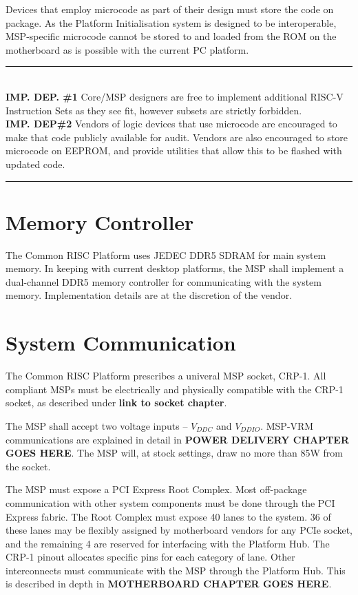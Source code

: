 \documentclass[12pt]{report}
\begin{document}
Devices that employ microcode as part of their design must store the code on package. As the Platform Initialisation
system is designed to be interoperable, MSP-specific microcode cannot be stored to and loaded from the ROM on the
motherboard as is possible with the current PC platform.

\rule{16cm}{0.4pt}\\
\small
\textbf{IMP. DEP. \#1\:}
Core/MSP designers are free to implement additional RISC-V Instruction Sets as they see fit, however subsets are
strictly forbidden.\\
\textbf{IMP. DEP\#2\:}
Vendors of logic devices that use microcode are encouraged to make that code publicly available for audit. Vendors are
also encouraged to store microcode on EEPROM, and provide utilities that allow this to be flashed with updated code.\\
\normalsize
\rule{16cm}{0.4pt}
\newpage

\section{Memory Controller}
The Common RISC Platform uses JEDEC DDR5 SDRAM for main system memory. In keeping with current desktop platforms, the MSP
shall implement a dual-channel DDR5 memory controller for communicating with the system memory. Implementation details
are at the discretion of the vendor.

\section{System Communication}
The Common RISC Platform prescribes a univeral MSP socket, CRP-1. All compliant MSPs must be electrically and physically
compatible with the CRP-1 socket, as described under \textbf{link to socket chapter}.

The MSP shall accept two voltage inputs -- $V_{DDC}$ and $V_{DDIO}$. MSP-VRM communications are explained in detail
in \textbf{POWER DELIVERY CHAPTER GOES HERE}. The MSP will, at stock settings, draw no more than 85W from the socket.

The MSP must expose a PCI Express Root Complex. Most off-package communication with other system components must be done
through the PCI Express fabric. The Root Complex must expose 40 lanes to the system. 36 of these lanes may be flexibly
assigned by motherboard vendors for any PCIe socket, and the remaining 4 are reserved for interfacing with
the Platform Hub. The CRP-1 pinout allocates specific pins for each category of lane. Other interconnects must communicate
with the MSP through the Platform Hub. This is described in depth in \textbf{MOTHERBOARD CHAPTER GOES HERE}.
\end{document}
